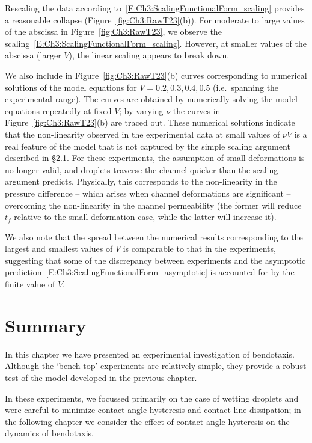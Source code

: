 Rescaling the data according to~\eqref{E:Ch3:ScalingFunctionalForm_scaling} provides a reasonable collapse (Figure~\ref{fig:Ch3:RawT23}(b)). For moderate to large values of the abscissa in Figure~\ref{fig:Ch3:RawT23}, we observe the scaling~\eqref{E:Ch3:ScalingFunctionalForm_scaling}. However, at smaller values of the abscissa (larger $V$), the linear scaling appears to break down.

We also include in Figure~\ref{fig:Ch3:RawT23}(b) curves corresponding to numerical solutions of the model equations for $V = 0.2, 0.3, 0.4, 0.5$ (i.e.~spanning the experimental range). The curves are obtained by numerically solving the model equations repeatedly at fixed $V$; by varying $\nu$ the curves in Figure~\ref{fig:Ch3:RawT23}(b) are traced out. These numerical solutions indicate that the non-linearity observed in the experimental data at small values of $\nu V$ is a real feature of the model that is not captured by the simple scaling argument described in \S2.1. For these experiments, the assumption of small deformations is no longer valid, and droplets traverse the channel quicker than the scaling argument predicts. Physically, this corresponds to the non-linearity in the pressure difference -- which arises when channel deformations are significant -- overcoming the non-linearity in the channel permeability (the former will reduce $t_f$ relative to the small deformation case, while the latter will increase it).

We also note that the spread between the numerical results corresponding to the largest and smallest values of $V$ is comparable to that in the experiments,  suggesting that some of the discrepancy between experiments and the asymptotic prediction~\eqref{E:Ch3:ScalingFunctionalForm_asymptotic} is accounted for by the finite value of $V$.

\section{Summary}
In this chapter we have presented an experimental investigation of bendotaxis. Although the `bench top' experiments are relatively simple, they provide a robust test of the model developed in the previous chapter.

In these experiments, we focussed primarily on the case of wetting droplets and were careful to minimize contact angle hysteresis and contact line dissipation; in the following chapter we consider the effect of contact angle hysteresis on the dynamics of bendotaxis.


